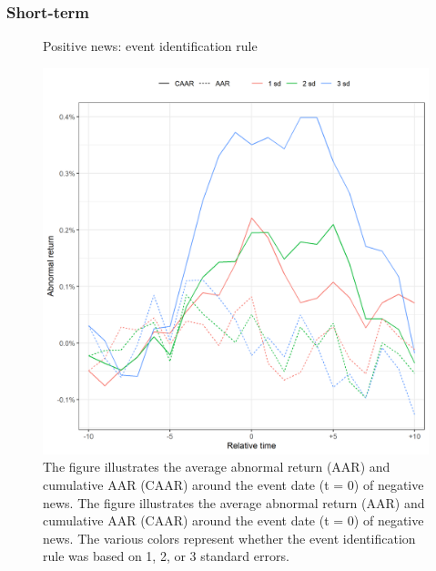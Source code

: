 \subsubsection{Short-term}

\begin{figure} [H]
    \centering
    \caption{Positive news: event identification rule}
    \includegraphics[scale=0.6]{Projekt/1.Figures analysis/ST_positive_sensitivity.png}
     \caption*{\footnotesize The figure illustrates the average abnormal return (AAR) and cumulative AAR (CAAR) around the event date (t = 0) of negative news. The figure illustrates the average abnormal return (AAR) and cumulative AAR (CAAR) around the event date (t = 0) of negative news. The various colors represent whether the event identification rule was based on 1, 2, or 3 standard errors. }
    \label{fig:ST_pos_sensi_sd}
\end{figure} 


